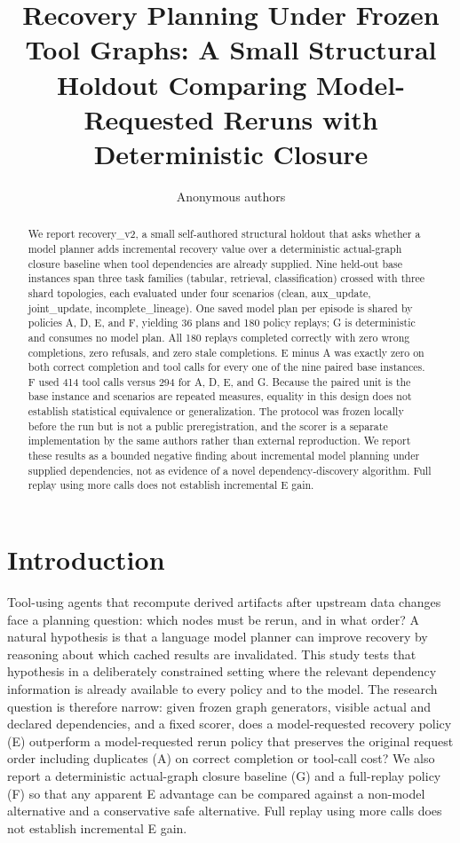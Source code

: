 \documentclass{article}
\title{Recovery Planning Under Frozen Tool Graphs: A Small Structural Holdout Comparing Model-Requested Reruns with Deterministic Closure}
\author{Anonymous authors}
\begin{document}
\maketitle


\begin{abstract}

We report recovery\_v2, a small self-authored structural holdout that asks whether a model planner adds incremental recovery value over a deterministic actual-graph closure baseline when tool dependencies are already supplied. Nine held-out base instances span three task families (tabular, retrieval, classification) crossed with three shard topologies, each evaluated under four scenarios (clean, aux\_update, joint\_update, incomplete\_lineage). One saved model plan per episode is shared by policies A, D, E, and F, yielding 36 plans and 180 policy replays; G is deterministic and consumes no model plan. All 180 replays completed correctly with zero wrong completions, zero refusals, and zero stale completions. E minus A was exactly zero on both correct completion and tool calls for every one of the nine paired base instances. F used 414 tool calls versus 294 for A, D, E, and G. Because the paired unit is the base instance and scenarios are repeated measures, equality in this design does not establish statistical equivalence or generalization. The protocol was frozen locally before the run but is not a public preregistration, and the scorer is a separate implementation by the same authors rather than external reproduction. We report these results as a bounded negative finding about incremental model planning under supplied dependencies, not as evidence of a novel dependency-discovery algorithm. Full replay using more calls does not establish incremental E gain.

\end{abstract}

\section{Introduction}

Tool-using agents that recompute derived artifacts after upstream data changes face a planning question: which nodes must be rerun, and in what order? A natural hypothesis is that a language model planner can improve recovery by reasoning about which cached results are invalidated. This study tests that hypothesis in a deliberately constrained setting where the relevant dependency information is already available to every policy and to the model. The research question is therefore narrow: given frozen graph generators, visible actual and declared dependencies, and a fixed scorer, does a model-requested recovery policy (E) outperform a model-requested rerun policy that preserves the original request order including duplicates (A) on correct completion or tool-call cost? We also report a deterministic actual-graph closure baseline (G) and a full-replay policy (F) so that any apparent E advantage can be compared against a non-model alternative and a conservative safe alternative. Full replay using more calls does not establish incremental E gain.
\end{document}
